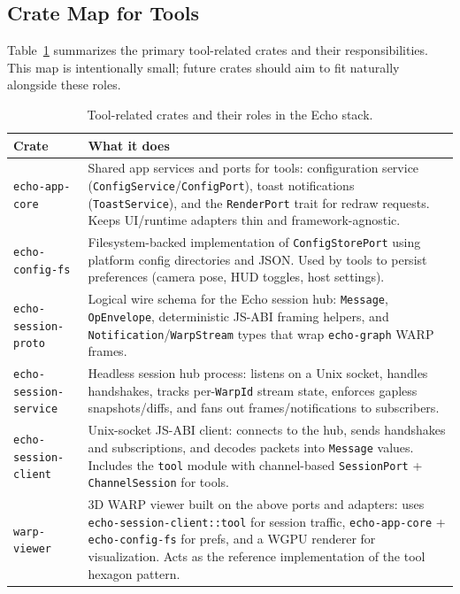 \subsection{Crate Map for Tools}

Table~\ref{tab:tool-crate-map} summarizes the primary tool-related crates and
their responsibilities. This map is intentionally small; future crates should
aim to fit naturally alongside these roles.

\begin{table}[h]
  \centering
  \begin{tabular}{@{}p{}p{}@{}}
    \toprule
    \textbf{Crate} & \textbf{What it does} \\
    \midrule
    \texttt{echo-app-core}
      & Shared app services and ports for tools: configuration service
        (\texttt{ConfigService}/\texttt{ConfigPort}), toast notifications
        (\texttt{ToastService}), and the \texttt{RenderPort} trait for
        redraw requests. Keeps UI/runtime adapters thin and framework-agnostic. \\
    \texttt{echo-config-fs}
      & Filesystem-backed implementation of \texttt{ConfigStorePort} using
        platform config directories and JSON. Used by tools to persist
        preferences (camera pose, HUD toggles, host settings). \\
    \texttt{echo-session-proto}
      & Logical wire schema for the Echo session hub: \texttt{Message},
        \texttt{OpEnvelope}, deterministic JS-ABI framing helpers, and
        \texttt{Notification}/\texttt{WarpStream} types that wrap
        \texttt{echo-graph} WARP frames. \\
    \texttt{echo-session-service}
      & Headless session hub process: listens on a Unix socket, handles
        handshakes, tracks per-\texttt{WarpId} stream state, enforces gapless
        snapshots/diffs, and fans out frames/notifications to subscribers. \\
    \texttt{echo-session-client}
      & Unix-socket JS-ABI client: connects to the hub, sends handshakes and
        subscriptions, and decodes packets into \texttt{Message} values.
        Includes the \texttt{tool} module with channel-based
        \texttt{SessionPort} + \texttt{ChannelSession} for tools. \\
    \texttt{warp-viewer}
      & 3D WARP viewer built on the above ports and adapters: uses
        \texttt{echo-session-client::tool} for session traffic,
        \texttt{echo-app-core} + \texttt{echo-config-fs} for prefs, and a
        WGPU renderer for visualization. Acts as the reference implementation
        of the tool hexagon pattern. \\
    \bottomrule
  \end{tabular}
  \caption{Tool-related crates and their roles in the Echo stack.}
  \label{tab:tool-crate-map}
\end{table}
